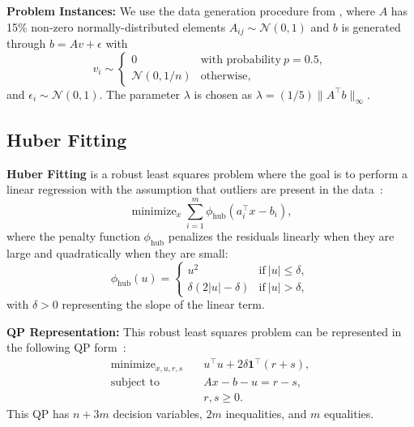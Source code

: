 \documentclass{article} %
\DeclareMathOperator*{\minimize}{minimize}
\DeclareMathOperator*{\st}{subject\ to}
\begin{document}
\textbf{Problem Instances:} We use the data generation procedure from \citep{stellato2020osqp}, where $A$ has 15\% non-zero normally-distributed elements $A_{ij} \sim \mathcal{N}(0, 1)$ and $b$ is generated through $b = Av + \epsilon$ with
\begin{equation}
    v_i \sim \begin{cases}
        0 & \text{with probability} \ p = 0.5, \\
        \mathcal{N}(0, 1/n) & \text{otherwise},
    \end{cases}
\end{equation}
and $\epsilon_i \sim \mathcal{N}(0, 1)$. The parameter $\lambda$ is chosen as $\lambda = (1/5)\lVert A^\top b \rVert_\infty$.

\subsection{Huber Fitting}

\textbf{Huber Fitting} is a robust least squares problem where the goal is to perform a linear regression with the assumption that outliers are present in the data~\citep{huber1964robust,huber1981robust}:
\begin{equation}
    \minimize_{x} \sum_{i = 1}^m \phi_\text{hub} (a_i^\top x - b_i),
\end{equation}
where the penalty function $\phi_\text{hub}$ penalizes the residuals linearly when they are large and quadratically when they are small:
\begin{equation}
    \phi_\text{hub}(u) = \begin{cases}
        u^2 & \text{if} \ |u| \leq
        \delta, \\
        \delta(2|u| - \delta) & \text{if} \ |u| > \delta,
    \end{cases}
\end{equation}
with $\delta > 0$ representing the slope of the linear term.

\textbf{QP Representation:} This robust least squares problem can be represented in the following QP form~\citep{stellato2020osqp}:
\begin{subequations}
\begin{align}
    \minimize_{x, u, r, s} \quad & u^\top u + 2 \delta \mathbf{1}^\top (r + s), \\
    \st \quad & Ax - b - u = r - s, \\
    & r, s \geq 0.
\end{align}
\end{subequations}
This QP has $n + 3m$ decision variables, $2m$ inequalities, and $m$ equalities.
\end{document}
